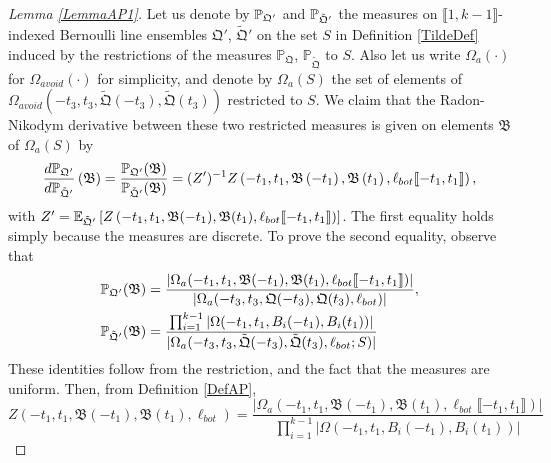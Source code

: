 \begin{proof}[Lemma \ref{LemmaAP1}]
	
	Let us denote by $\mathbb{P}_{\mathfrak{Q}'}$ and $\mathbb{P}_{\tilde{\mathfrak{Q}}'}$ the measures on $\llbracket 1, k-1\rrbracket$-indexed Bernoulli line ensembles $\mathfrak{Q}'$, $\tilde{\mathfrak{Q}}'$ on the set $S$ in Definition \ref{TildeDef} induced by the restrictions of the measures $\mathbb{P}_{\mathfrak{Q}}$, $\mathbb{P}_{\tilde{\mathfrak{Q}}}$ to $S$. Also let us write $\Omega_a(\cdot)$ for $\Omega_{avoid}(\cdot)$ for simplicity, and denote by $\Omega_a(S)$ the set of elements of $\Omega_{avoid}(-t_3,t_3,\tilde{\mathfrak{Q}}(-t_3),\tilde{\mathfrak{Q}}(t_3))$ restricted to $S$. We claim that the Radon-Nikodym derivative between these two restricted measures is given on elements $\mathfrak B$ of $\Omega_a(S)$ by \begin{equation}\label{propRadon}
		\frac{d\mathbb{P}_{\mathfrak{Q}'}}{d\mathbb{P}_{\tilde{\mathfrak{Q}}'}}\left(\mathfrak B\right) = \frac{\mathbb{P}_{\mathfrak{Q}'}(\mathfrak{B})}{\mathbb{P}_{\tilde{\mathfrak{Q}}'}(\mathfrak{B})} = (Z')^{-1} Z\left(-t_1,t_1,\mathfrak{B}\left(-t_1\right),\mathfrak{B}\left(t_1\right),\ell_{bot}\llbracket -t_1,t_1\rrbracket\right),
	\end{equation}
	with $Z' = \mathbb{E}_{\tilde{\mathfrak{Q}}'}\left[Z\left(-t_1, t_1, \mathfrak B(-t_1), \mathfrak B(t_1), \ell_{bot}\llbracket -t_1, t_1\rrbracket\right)\right]$. The first equality holds simply because the measures are discrete. To prove the second equality, observe that
	\begin{equation}
		\begin{split}
			\mathbb{P}_{\mathfrak{Q}'}(\mathfrak{B}) &= \frac{|\Omega_a(-t_1,t_1,\mathfrak{B}(-t_1),\mathfrak{B}(t_1),\ell_{bot}\llbracket -t_1,t_1\rrbracket)|}{|\Omega_a(-t_3,t_3,{\mathfrak{Q}}(-t_3),{\mathfrak{Q}}(t_3),\ell_{bot})|}, 
			\\
			\mathbb{P}_{\tilde{\mathfrak{Q}}'}(\mathfrak{B}) &= \frac{\prod_{i = 1}^{k-1}|\Omega(-t_1,t_1,B_i(-t_1),B_i(t_1))|}{|\Omega_a(-t_3,t_3,\tilde{\mathfrak{Q}}(-t_3),\tilde{\mathfrak{Q}}(t_3),\ell_{bot};S)|}
		\end{split}
	\end{equation}
	These identities follow from the restriction, and the fact that the measures are uniform. Then, from Definition \ref{DefAP}, 
	\[
	Z(-t_1,t_1,\mathfrak{B}(-t_1),\mathfrak{B}(t_1),\ell_{bot}) = \frac{|\Omega_a(-t_1,t_1,\mathfrak{B}(-t_1),\mathfrak{B}(t_1),\ell_{bot}\llbracket-t_1,t_1\rrbracket)|}{\prod_{i = 1}^{k-1}|\Omega(-t_1,t_1, B_i(-t_1),B_i(t_1))|}
\]
\end{proof}
